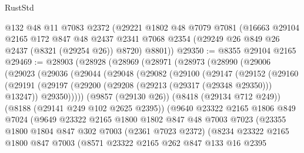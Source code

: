 \begin{lexlean}{RustStd}
\begin{coremodule}
    @132
    @48
    @11
    @7083
    @2372
    (@29221
      @1802
      @48
      @7079
      @7081
      (@16663
        @29104
        @2165
        @172
        @847
        @48
        @2437
        @2341
        @7068
        @2354
        (@29249 @26 @849 @26 @2437 (@8321 (@29254 @26)) @8720)
        @8801))
@29350 := @8355 @29104 @2165
@29469 := @28903
    (@28928
      (@28969
        (@28971
          (@28973
            (@28990
              (@29006
                (@29023
                  (@29036
                    (@29044
                      (@29048
                        (@29082
                          (@29100
                            (@29147
                              (@29152
                                (@29160
                                  (@29191
                                    (@29197
                                      (@29200 (@29208 (@29213 (@29317 (@29348 @29350))) @13247))
                                      @29350)))))
                            (@9857 (@29130 @26))
                            (@8418 (@29134 @712 @249))
                            (@8188 (@29141 @249 @102 @2625 @2395))
                            (@9640
                              @23322
                              @2165
                              @1806
                              @849
                              @7024
                              (@9649
                                @23322
                                @2165
                                @1800
                                @1802
                                @847
                                @48
                                @7003
                                @7023
                                (@23355
                                  @1800
                                  @1804
                                  @847
                                  @302
                                  @7003
                                  (@2361 @7023 @2372)
                                  (@8234
                                    @23322
                                    @2165
                                    @1800
                                    @847
                                    @7003
                                    (@8571
                                      @23322
                                      @2165
                                      @262
                                      @847
                                      @133
                                      @16
                                      @2395

\end{coremodule}
\end{lexlean}
